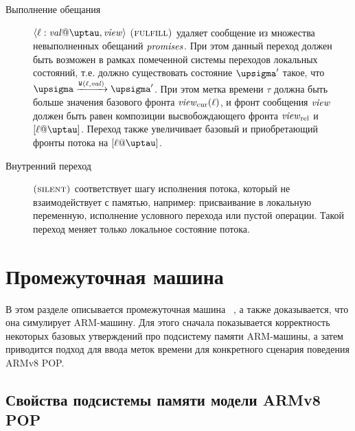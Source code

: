 \begin{description}
  \item[Выполнение обещания] $\writeEvt{\loc}{\stval}{\tau}{\R}$ $\textsc{(fulfill)}$ удаляет сообщение из множества
    невыполненных обещаний $\mathit{promises}$. При этом данный переход должен быть возможен в
    рамках помеченной системы переходов локальных состояний, т.е. должно существовать
    состояние $\pstate'$ такое, что $\pstate \xrightarrow{\wlab{}{\loc}{\stval}} \pstate'$.
    При этом метка времени $\tau$ должна быть больше значения базового фронта $\mathit{view}_{\mathrm{cur}}(\ell)$,
    и фронт сообщения $\mathit{view}$ должен быть равен композиции высвобождающего фронта $\mathit{view}_{\mathrm{rel}}$
    и $[\loc@\tau]$. Переход также увеличивает базовый и приобретающий фронты потока на $[\loc@\tau]$.

  \item[Внутренний переход] $\textsc{(silent)}$ соответствует шагу исполнения потока, который не взаимодействует
    с памятью, например: присваивание в локальную переменную, исполнение условного перехода или пустой операции.
    Такой переход меняет только локальное состояние потока.
\end{description}

\section{Промежуточная машина \ARMt}
В этом разделе описывается промежуточная машина \ARMt~, а также доказывается, что она симулирует
ARM-машину.
Для этого сначала показывается корректность некоторых базовых утверждений
про подсистему памяти ARM-машины,
а затем приводится подход для ввода меток времени для конкретного сценария поведения ARMv8 POP.

\subsection{Свойства подсистемы памяти модели ARMv8 POP}

